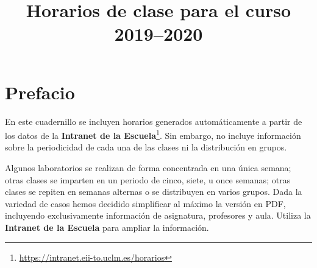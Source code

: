 \documentclass[a4paper]{article}
\title{Horarios de clase para el curso 2019--2020}
\author{}
\begin{document}
\portada
\clearpage\restoregeometry

\tableofcontents
\clearpage

\section*{Prefacio}

\noindent En este cuadernillo se incluyen horarios generados automáticamente a partir de los datos de la \textbf{Intranet de la Escuela}\footnote{\url{https://intranet.eii-to.uclm.es/horarios}}.  Sin embargo, no incluye información sobre la periodicidad de cada una de las clases ni la distribución en grupos.

Algunos laboratorios se realizan de forma concentrada en una única semana; otras clases se imparten en un periodo de cinco, siete, u once semanas; otras clases se repiten en semanas alternas o se distribuyen en varios grupos.  Dada la variedad de casos hemos decidido simplificar al máximo la versión en PDF, incluyendo exclusivamente información de asignatura, profesores y aula.  Utiliza la \textbf{Intranet de la Escuela} para ampliar la información.

\clearpage\restoregeometry

\setcounter{section}{1}
\setcounter{subsection}{1}
\setcounter{subsubsection}{0}
{}
{}






\setcounter{subsection}{2}
\setcounter{subsubsection}{0}
{}






\setcounter{section}{2}
\setcounter{subsection}{1}
\setcounter{subsubsection}{0}
{}
{}






\setcounter{subsection}{2}
\setcounter{subsubsection}{0}
{}
\end{document}
